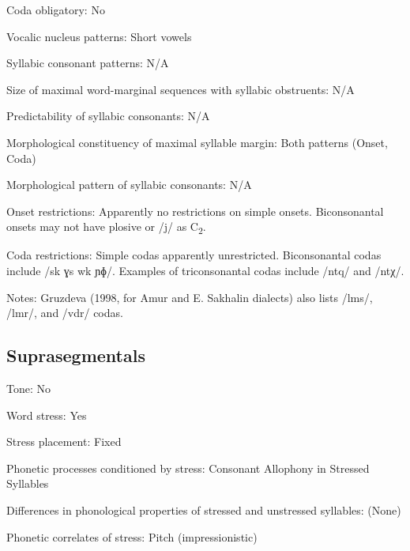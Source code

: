 {\begin{appendixdesc}
\item[Coda obligatory:] No

\item[Vocalic nucleus patterns:] Short vowels

\item[Syllabic consonant patterns:] N/A

\item[Size of maximal word-marginal sequences with syllabic obstruents:] N/A

\item[Predictability of syllabic consonants:] N/A

\item[Morphological constituency of maximal syllable margin:] Both patterns (Onset, Coda)

\item[Morphological pattern of syllabic consonants:] N/A

\item[Onset restrictions:] Apparently no restrictions on simple onsets. Biconsonantal onsets may not have plosive or /j/ as C\textsubscript{2}.

\item[Coda restrictions:] Simple codas apparently unrestricted. Biconsonantal codas include /sk ɣs wk ɲɸ/. Examples of triconsonantal codas include /ntq/ and /ntχ/.

\item[Notes:] Gruzdeva (1998, for Amur and E. Sakhalin dialects) also lists /lms/, /lmr/, and /vdr/ codas.
\end{appendixdesc}
\subsection*{Suprasegmentals}
\begin{appendixdesc}
\item[Tone:] No

\item[Word stress:] Yes

\item[Stress placement:] Fixed

\item[Phonetic processes conditioned by stress:] Consonant Allophony in Stressed Syllables

\item[Differences in phonological properties of stressed and unstressed syllables:] (None)

\item[Phonetic correlates of stress:] Pitch (impressionistic)
\end{appendixdesc}
}
